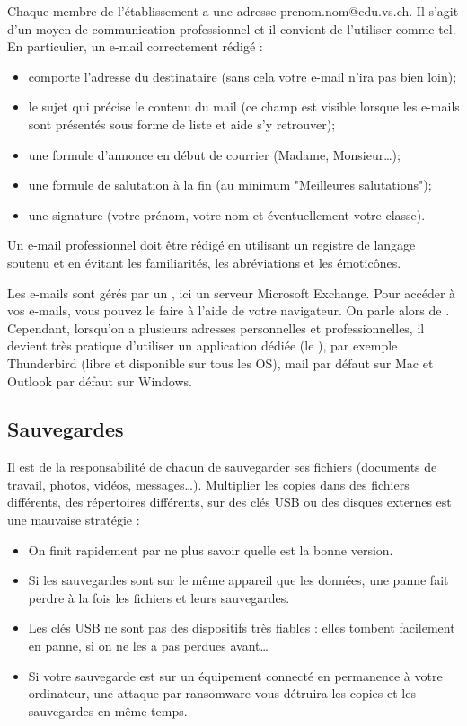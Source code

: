 \documentclass[10pt,a4paper]{report}
\begin{document}
Chaque membre de l'établissement a une adresse prenom.nom@edu.vs.ch. Il s'agit d'un moyen de communication professionnel et il convient de l'utiliser comme tel. En particulier, un e-mail correctement rédigé :
\begin{itemize}
	\item comporte l'adresse du destinataire (sans cela votre e-mail n'ira pas bien loin);
	\item le sujet qui précise le contenu du mail (ce champ est visible lorsque les e-mails sont présentés sous forme de liste et aide s'y retrouver);
	\item une formule d'annonce en début de courrier (Madame, Monsieur\dots);
	\item une formule de salutation à la fin (au minimum "Meilleures salutations");
	\item une signature (votre prénom, votre nom et éventuellement votre classe).
\end{itemize}

Un e-mail professionnel doit être rédigé en utilisant un registre de langage soutenu et en évitant les familiarités, les abréviations et les émoticônes.

Les e-mails sont gérés par un , ici un serveur Microsoft Exchange. Pour accéder à vos e-mails, vous pouvez le faire à l'aide de votre navigateur. On parle alors de . Cependant, lorsqu'on a plusieurs adresses personnelles et professionnelles, il devient très pratique d'utiliser un application dédiée (le ), par exemple Thunderbird (libre et disponible sur tous les OS), mail par défaut sur Mac et Outlook par défaut sur Windows.




\subsection{Sauvegardes}

Il est de la responsabilité de chacun de sauvegarder ses fichiers (documents de travail, photos, vidéos, messages\dots). Multiplier les copies dans des fichiers différents, des répertoires différents, sur des clés USB ou des disques externes est une mauvaise stratégie : 
\begin{itemize}
	\item On finit rapidement par ne plus savoir quelle est la bonne version.
	\item Si les sauvegardes sont sur le même appareil que les données, une panne fait perdre à la fois les fichiers et leurs sauvegardes.
	\item Les clés USB ne sont pas des dispositifs très fiables : elles tombent facilement en panne, si on ne les a pas perdues avant\dots
	\item Si votre sauvegarde est sur un équipement connecté en permanence à votre ordinateur, une attaque par ransomware vous détruira les copies et les sauvegardes en même-temps.
\end{itemize}
\end{document}
